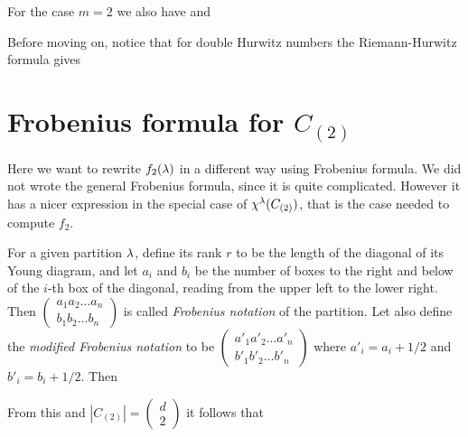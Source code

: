 \documentclass[../main/main.tex]{subfiles}
\begin{document}
For the case $m=2$ we also have
and


Before moving on, notice that for double Hurwitz numbers the Riemann-Hurwitz formula gives

\section{Frobenius formula for $C_{(2)}$}

Here we want to rewrite $f_2(\lambda)$ in a different way using Frobenius formula. We did not wrote the general Frobenius formula, since it is quite complicated. However it has a nicer expression in the special case of $\chi^\lambda(C_{(2)})$, that is the case needed to compute $f_2$.

For a given partition $\lambda$, define its rank $r$ to be the length of the diagonal of its Young diagram, and let $a_i$ and $b_i$ be the number of boxes to the right and below of the $i$-th box of the diagonal, reading from the upper left to the lower right. Then $\begin{pmatrix}a_1a_2\ldots a_n\\b_1b_2\ldots b_n\end{pmatrix}$ is called \emph{Frobenius notation} of the partition.  Let also define the \emph{modified Frobenius notation} to be $\begin{pmatrix}a'_1a'_2\ldots a'_n\\b'_1b'_2\ldots b'_n\end{pmatrix}$ where $a'_i=a_i+1/2$ and $b'_i=b_i+1/2$. Then
	
\begin{lemma}[{\cite[Ex. 4.17(c)]{FH}}]
\end{lemma}

From this and $|C_{(2)}|=\begin{pmatrix}d\\2\end{pmatrix}$ it follows that 
\end{document}
